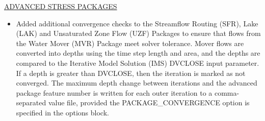 
	\underline{ADVANCED STRESS PACKAGES}
	\begin{itemize}
		\item Added additional convergence checks to the Streamflow Routing (SFR), Lake (LAK) and Unsaturated Zone Flow (UZF) Packages to ensure that flows from the Water Mover (MVR) Package meet solver tolerance.  Mover flows are converted into depths using the time step length and area, and the depths are compared to the Iterative Model Solution (IMS) DVCLOSE input parameter.  If a depth is greater than DVCLOSE, then the iteration is marked as not converged.  The maximum depth change between iterations and the advanced package feature number is written for each outer iteration to a comma-separated value file, provided the PACKAGE\_CONVERGENCE option is specified in the options block.
		
	\end{itemize}




